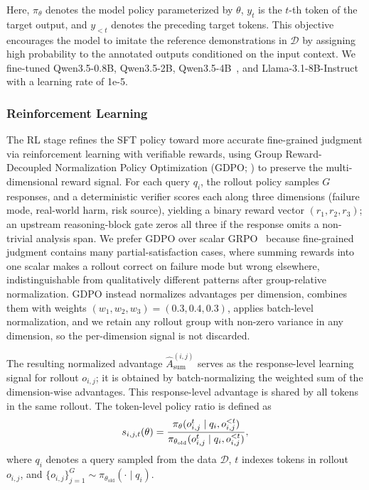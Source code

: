 \documentclass{llmxive}
\begin{document}
Here, $\pi_\theta$ denotes the model policy parameterized by $\theta$,
$y_t$ is the $t$-th token of the target output, and $y_{<t}$ denotes the
preceding target tokens. This objective encourages the model to imitate
the reference demonstrations in $\mathcal{D}$ by assigning high
probability to the annotated outputs conditioned on the input context. We fine-tuned Qwen3.5-0.8B, Qwen3.5-2B, Qwen3.5-4B~\citep{qwen35}, and Llama-3.1-8B-Instruct~\citep{dubey2024llama} with a learning rate of 1e-5.

\subsubsection{Reinforcement Learning}
\label{sec:rl}

The RL stage refines the SFT policy toward more accurate fine-grained judgment via reinforcement learning with verifiable rewards, using Group Reward-Decoupled Normalization Policy Optimization (GDPO; \citealp{liu2026gdpo}) to preserve the multi-dimensional reward signal. For each query $q_i$, the rollout policy samples $G$ responses, and a deterministic verifier scores each along three dimensions (failure mode, real-world harm, risk source), yielding a binary reward vector $(r_1,r_2,r_3)$; an upstream reasoning-block gate zeros all three if the response omits a non-trivial analysis span. We prefer GDPO over scalar GRPO~\citep{shao2024deepseekmath} because fine-grained judgment contains many partial-satisfaction cases, where summing rewards into one scalar makes a rollout correct on failure mode but wrong elsewhere, indistinguishable from qualitatively different patterns after group-relative normalization. GDPO instead normalizes advantages per dimension, combines them with weights $(w_1,w_2,w_3)=(0.3,0.4,0.3)$, applies batch-level normalization, and we retain any rollout group with non-zero variance in any dimension, so the per-dimension signal is not discarded.

The resulting normalized advantage
$\hat A_{\mathrm{sum}}^{(i,j)}$ serves as the response-level learning
signal for rollout $o_{i,j}$; it is obtained by batch-normalizing the
weighted sum of the dimension-wise advantages. This response-level
advantage is shared by all tokens in the same rollout. The token-level
policy ratio is defined as
\begin{equation}
\small
s_{i,j,t}(\theta)
=
\frac{
\pi_\theta(o_{i,j}^{t}\mid q_i,o_{i,j}^{<t})
}{
\pi_{\theta_{\mathrm{old}}}(o_{i,j}^{t}\mid q_i,o_{i,j}^{<t})
},
\label{eq:policy-ratio}
\end{equation}
where $q_i$ denotes a query sampled from the data
$\mathcal{D}$, $t$ indexes tokens in rollout $o_{i,j}$, and
$\{o_{i,j}\}_{j=1}^{G}\sim\pi_{\theta_{\mathrm{old}}}(\cdot\mid q_i)$.
\end{document}
